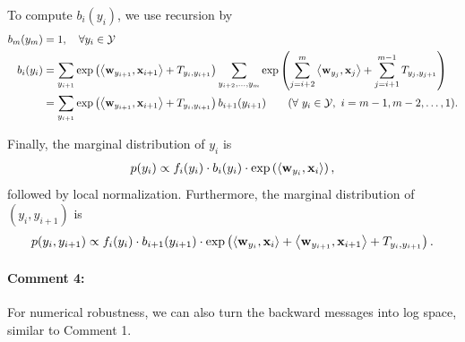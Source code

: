 \documentclass[11pt]{report}
\begin{document}
To compute $b_i(y_i)$, we use recursion by
\begin{align}
		\label{eq:rec_Z_backward_1}
	b_m(y_m) &= 1, \quad \forall y_i \in \mathcal{Y} \\
	b_i(y_i) &= \sum_{y_{i+1}} \exp \left(\left\langle \mathbf{\boldsymbol{w}}_{y_{i+1}},\mathbf{\boldsymbol{x}}_{i+1} \right\rangle + T_{y_{i}, y_{i+1}}\right)
	\sum_{y_{i+2}, \ldots, y_m} \exp \left(\sum_{j=i+2}^{m} \left\langle \mathbf{\boldsymbol{w}}_{y_j},\mathbf{\boldsymbol{x}}_j \right\rangle + \sum_{j=i+1}^{m-1} T_{y_j, y_{j+1}}\right) \\
		\label{eq:rec_Z_backward_2}
	&= \sum_{y_{i+1}}\exp \left(\left\langle \mathbf{\boldsymbol{w}}_{y_{i+1}},\mathbf{\boldsymbol{x}}_{i+1} \right\rangle + T_{y_{i}, y_{i+1}}\right) b_{i+1}(y_{i+1})  \qquad (\forall\ y_i \in \mathcal{Y}, \ i = m-1, m-2, \ldots, 1).	 
\end{align}

Finally, the marginal distribution of $y_i$ is
\begin{align}
	p(y_i) \propto f_i(y_i) \cdot b_i(y_i) \cdot \exp \left(\left\langle \mathbf{\boldsymbol{w}}_{y_{i}},\mathbf{\boldsymbol{x}}_{i} \right\rangle\right),
\end{align}
followed by local normalization.
Furthermore, the marginal distribution of $(y_i, y_{i+1})$ is
\begin{align}
	p(y_i, y_{i+1}) \propto f_i(y_i) \cdot b_{i+1}(y_{i+1}) \cdot 
	\exp \left(\left\langle \mathbf{\boldsymbol{w}}_{y_{i}},\mathbf{\boldsymbol{x}}_{i} \right\rangle + \left\langle \mathbf{\boldsymbol{w}}_{y_{i+1}},\mathbf{\boldsymbol{x}}_{i+1} \right\rangle + T_{y_i, y_{i+1}}\right).
\end{align}

\paragraph{Comment 4:}
For numerical robustness,
we can also turn the backward messages into log space, similar to Comment 1.
\end{document}
